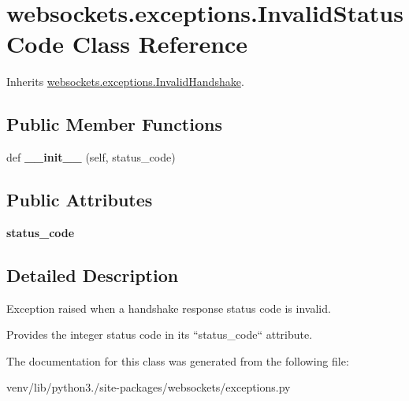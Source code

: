 \hypertarget{classwebsockets_1_1exceptions_1_1_invalid_status_code}{}\section{websockets.\+exceptions.\+Invalid\+Status\+Code Class Reference}
\label{classwebsockets_1_1exceptions_1_1_invalid_status_code}


Inherits \hyperlink{classwebsockets_1_1exceptions_1_1_invalid_handshake}{websockets.\+exceptions.\+Invalid\+Handshake}.

\subsection*{Public Member Functions}
\begin{DoxyCompactItemize}
\item 
\mbox{\label{classwebsockets_1_1exceptions_1_1_invalid_status_code_a142f7d86da2fa45b8e45c3f2c5475b2e}} 
def {\bfseries \+\_\+\+\_\+init\+\_\+\+\_\+} (self, status\+\_\+code)
\end{DoxyCompactItemize}
\subsection*{Public Attributes}
\begin{DoxyCompactItemize}
\item 
\mbox{\label{classwebsockets_1_1exceptions_1_1_invalid_status_code_a2c825ad7fc816553be704579d1314488}} 
{\bfseries status\+\_\+code}
\end{DoxyCompactItemize}


\subsection{Detailed Description}
\begin{DoxyVerb}Exception raised when a handshake response status code is invalid.

Provides the integer status code in its ``status_code`` attribute.\end{DoxyVerb}
 

The documentation for this class was generated from the following file\+:\begin{DoxyCompactItemize}
\item 
venv/lib/python3./site-\/packages/websockets/exceptions.\+py\end{DoxyCompactItemize}
